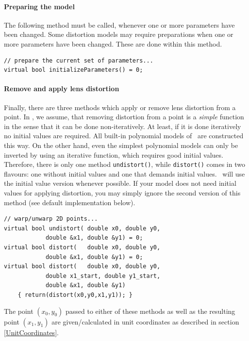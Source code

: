 \documentclass[10pt,a4paper]{article}
\begin{document}
\paragraph{Preparing the model}
The following method must be called, whenever one or more parameters have been changed.
Some distortion models may require preparations when one or more parameters
have been changed. These are done within this method.
\begin{lstlisting}[language=mycpp,tabsize=8]
// prepare the current set of parameters...
virtual bool initializeParameters() = 0;
\end{lstlisting}
\paragraph{Remove and apply lens distortion}
Finally, there are three methods which apply or remove lens distortion from a point.
In \tde, we assume, that removing distortion from a point is a {\it simple} function
in the sense that it can be done non-iteratively. At least, if it is done iteratively
no initial values are required. All built-in polynomial models of \tde\ are constructed
this way. On the other hand, even the simplest polynomial models can only be inverted
by using an iterative function, which requires good initial values.
Therefore, there is only one method {\tt undistort()}, while {\tt distort()} comes in two
flavours: one without initial values and one that demands initial values.
\tde\ will use the initial value version whenever possible. If your model does not need
initial values for applying distortion, you may simply ignore the second version of this
method (see default implementation below).
\begin{lstlisting}[language=mycpp,tabsize=8]
// warp/unwarp 2D points...
virtual bool undistort(	double x0, double y0,
			double &x1, double &y1) = 0;
virtual bool distort(	double x0, double y0,
			double &x1, double &y1) = 0;
virtual bool distort(	double x0, double y0,
			double x1_start, double y1_start,
			double &x1, double &y1)
	{ return(distort(x0,y0,x1,y1)); }
\end{lstlisting}
The point $(x_0,y_0)$ passed to either of these methods as well as the resulting point $(x_1,y_1)$
are given/calculated in unit coordinates as described in section \ref{UnitCoordinates}.
\end{document}
